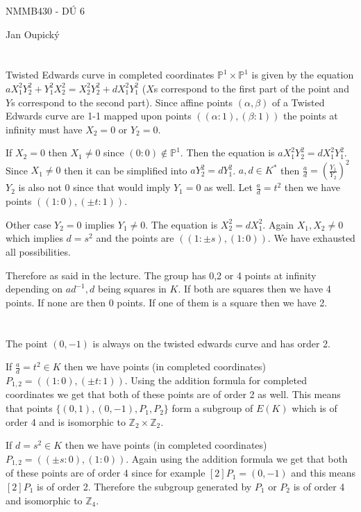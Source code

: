 \documentclass[12pt, a4paper]{article}
\begin{document}
\begin{center}
\large NMMB430 - DÚ 6

\normalsize Jan Oupický
\end{center}
\vspace{1\baselineskip}

\section{}
Twisted Edwards curve in completed coordinates $\mathbb{P}^1 \times \mathbb{P}^1$ is given by the equation $aX_1^2Y_2^2+Y_1^2X_2^2 = X_2^2Y_2^2 + dX_1^2Y_1^2$ ($X$s correspond to the first part of the point and $Y$s correspond to the second part). Since affine points $(\alpha, \beta)$ of a Twisted Edwards curve are 1-1 mapped upon points $((\alpha: 1), (\beta : 1))$ the points at infinity must have $X_2 = 0$ or $Y_2 = 0$.

If $X_2 = 0$ then $X_1 \neq 0$ since $(0:0) \notin \mathbb{P}^1$. Then the equation is $aX_1^2Y_2^2 = dX_1^2Y_1^2$. Since $X_1 \neq 0$ then it can be simplified into $aY_2^2 = dY_1^2$. $a,d \in K^*$ then $\frac{a}{d} = \left(\frac{Y_1}{Y_2}\right)^2$ $Y_2$ is also not 0 since that would imply $Y_1=0$ as well. Let $\frac{a}{d}=t^2$ then we have points $((1:0),(\pm t:1))$.

Other case $Y_2 = 0$ implies $Y_1 \neq 0$. The equation is $X_2^2 = dX_1^2$. Again $X_1,X_2 \neq 0$ which implies $d = s^2$ and the points are $((1:\pm s),(1:0))$. We have exhausted all possibilities.

Therefore as said in the lecture. The group has 0,2 or 4 points at infinity depending on $ad^{-1}, d$ being squares in $K$. If both are squares then we have 4 points. If none are then 0 points. If one of them is a square then we have 2.

\section{}
The point $(0,-1)$ is always on the twisted edwards curve and has order 2. 

If $\frac{a}{d} = t^2 \in K$ then we have points (in completed coordinates) $P_{1,2}= ((1:0),(\pm t:1))$. Using the addition formula for completed coordinates we get that both of these points are of order 2 as well. This means that points $\{(0,1), (0,-1), P_1, P_2\}$ form a subgroup of $E(K)$ which is of order 4 and is isomorphic to $\mathbb{Z}_2 \times \mathbb{Z}_2$.

If $d = s^2 \in K$ then we have points (in completed coordinates) $P_{1,2}= ((\pm s:0),(1:0))$. Again using the addition formula we get that both of these points are of order 4 since for example $[2]P_1 = (0,-1)$ and this means $[2]P_1$ is of order 2. Therefore the subgroup generated by $P_1$ or $P_2$ is of order 4 and isomorphic to $\mathbb{Z}_4$.
\end{document}
